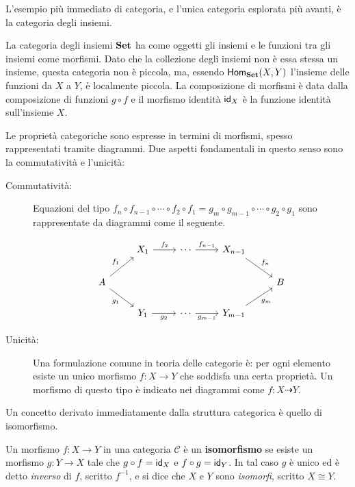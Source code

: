 L'esempio più immediato di categoria, e l'unica categoria esplorata più avanti, è la categoria degli insiemi.

\begin{example}
  La categoria degli insiemi \(\operatorname{\mathbf{Set}}\) ha come oggetti gli insiemi e le funzioni tra gli insiemi come morfismi. Dato che la collezione degli insiemi non è essa stessa un insieme, questa categoria non è piccola, ma, essendo \(\operatorname{\operatorname{\mathsf{Hom}}}_{\operatorname{\mathbf{Set}}}(X, Y)\) l'insieme delle funzioni da \(X\) a \(Y\), è localmente piccola. La composizione di morfismi è data dalla composizione di funzioni \(g \circ f\) e il morfismo identità \(\operatorname{\operatorname{\mathsf{id}}}_X\) è la funzione identità sull'insieme \(X\).
\end{example}

Le proprietà categoriche sono espresse in termini di morfismi, spesso rappresentati tramite diagrammi. Due aspetti fondamentali in questo senso sono la commutatività e l'unicità:
\begin{description}
  \item[Commutatività:] Equazioni del tipo \(f_n \circ f_{n-1} \circ \cdots \circ f_2 \circ f_1 = g_m \circ g_{m-1} \circ \cdots \circ g_2 \circ g_1\) sono rappresentate da diagrammi come il seguente.

        \[\begin{tikzcd}
            & X_1 \arrow[r, "f_2"] & \cdots \arrow[r, "f_{n-1}"] & X_{n-1} \arrow[dr, "f_n"] & \\
            A \arrow[ur, "f_1"] \arrow[dr, "g_1"'] & & & & B \\
            & Y_1 \arrow[r, "g_2"'] & \cdots \arrow[r, "g_{m-1}"'] & Y_{m-1} \arrow[ur, "g_m"'] &
          \end{tikzcd}\]

  \item[Unicità: ] Una formulazione comune in teoria delle categorie è: per ogni elemento esiste un unico morfismo \(f: X \to Y\) che soddisfa una certa proprietà. Un morfismo di questo tipo è indicato nei diagrammi come \(f: X \dashrightarrow Y\).
\end{description}

Un concetto derivato immediatamente dalla struttura categorica è quello di isomorfismo.

\begin{definition}[Isomorfismo]
  Un morfismo \(f: X \to Y\) in una categoria \(\mathcal{C}\) è un \textbf{isomorfismo} se esiste un morfismo \(g: Y \to X\) tale che \(g \circ f = \operatorname{\operatorname{\mathsf{id}}}_X\) e \(f \circ g = \operatorname{\operatorname{\mathsf{id}}}_Y\). In tal caso \(g\) è unico ed è detto \textit{inverso} di \(f\), scritto \(f^{-1}\), e si dice che \(X\) e \(Y\) sono \textit{isomorfi}, scritto \(X \cong Y\).
\end{definition}

